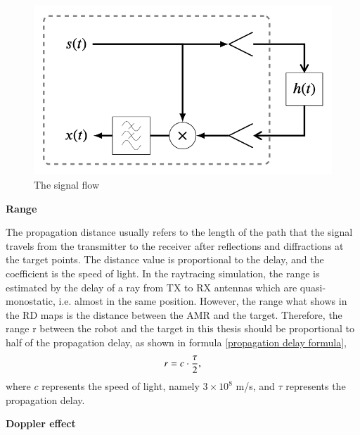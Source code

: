 \documentclass[12pt,DIV14,BCOR12mm,a4paper,footinclude=false,headinclude,parskip=half-,twoside,openright,cleardoublepage=empty,toc=index,bibliography=totoc,listof=totoc]{scrreprt}
\numberwithin{equation}{chapter}
\begin{document}
\begin{figure}
	\centering
	\includegraphics[scale=.6]{figures/signal_flow.png}
	\caption{The signal flow \cite{hafner_parameter_2021}}
	\label{signal_flow}
\end{figure}

\begin{spacing}{1.5}
\textbf{\large{Range}}
\end{spacing}

The propagation distance usually refers to the length of the path that the signal travels from the transmitter to the receiver after reflections and diffractions at the target points. The distance value is proportional to the delay, and the coefficient is the speed of light. In the raytracing simulation, the range is estimated by the delay of a ray from TX to RX antennas which are quasi-monostatic, i.e. almost in the same position. However, the range what shows in the RD maps is the distance between the AMR and the target. Therefore, the range r between the robot and the target in this thesis should be proportional to half of the propagation delay, as shown in formula \ref{propagation delay formula},
\begin{equation}
    \centering
    r = c \cdot \frac{\tau}{2},
    \label{propagation delay formula}
\end{equation}
where $c$ represents the speed of light, namely $3 \times 10^8$ m/s, and $\tau$ represents the propagation delay.

\begin{spacing}{1.5}
\textbf{\large{Doppler effect}}
\end{spacing}
\end{document}

